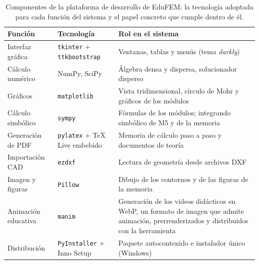 \begin{table}[H]
\centering
\caption[Componentes de la plataforma de desarrollo de EduFEM.]{Componentes de la plataforma de desarrollo de EduFEM: la tecnología adoptada para cada función del sistema y el papel concreto que cumple dentro de él.}
\label{tab:stack}
\setlength{\tabcolsep}{4pt}
\begin{tabular}{@{}l >{\raggedright\arraybackslash}p{4.0cm} >{\raggedright\arraybackslash}p{6.9cm}@{}}
\toprule
\textbf{Función} & \textbf{Tecnología} & \textbf{Rol en el sistema} \\
\midrule
Interfaz gráfica      & \texttt{tkinter} + \texttt{ttkbootstrap} & Ventanas, tablas y menús (tema \emph{darkly}) \\
Cálculo numérico      & NumPy, SciPy                              & Álgebra densa y dispersa, solucionador disperso \\
Gráficos              & \texttt{matplotlib}                      & Vista tridimensional, círculo de Mohr y gráficos de los módulos \\
Cálculo simbólico     & \texttt{sympy}                           & Fórmulas de los módulos; integrando simbólico de M5 y de la memoria \\
Generación de PDF     & \texttt{pylatex} + \TeX{} Live embebido    & Memoria de cálculo paso a paso y documentos de teoría \\
Importación CAD       & \texttt{ezdxf}                            & Lectura de geometría desde archivos DXF \\
Imagen y figuras      & \texttt{Pillow}                           & Dibujo de los contornos y de las figuras de la memoria \\
Animación educativa   & \texttt{manim}                            & Generación de los videos didácticos en WebP, un formato de imagen que admite animación, prerrenderizados y distribuidos con la herramienta \\
Distribución          & \texttt{PyInstaller} + Inno Setup         & Paquete autocontenido e instalador único (Windows) \\
\bottomrule
\end{tabular}
{\singlespacing{}}
\end{table}

